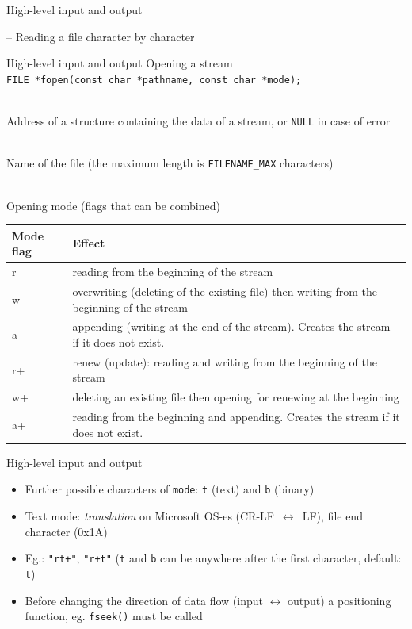 \documentclass[usenames,dvipsnames,aspectratio=169]{beamer}
\begin{document}
\begin{frame}{High-level input and output}
  \begin{exampleblock}{ -- Reading a file character by character}
    \scriptsize
    
  \end{exampleblock}
\end{frame}

\begin{frame}{High-level input and output}
  Opening a stream\\
  \footnotesize
  \texttt{FILE *fopen(const char *pathname, const char *mode);} \\
  \begin{description}[mm]
    \item[\texttt{FILE*}] \hfill \\
      Address of a structure containing the data of a stream, or \texttt{NULL} in case of error
    \item[\texttt{pathname}] \hfill \\
      Name of the file (the maximum length is \texttt{FILENAME\_MAX} characters)
    \item[\texttt{mode}] \hfill \\
      Opening mode (flags that can be combined)
  \end{description}
  \scriptsize
  \begin{tabular}{ll}
  Mode flag & Effect\\ \hline
  r & reading from the beginning of the stream\\
  w & overwriting (deleting of the existing file) then writing from the beginning of the stream\\
  a & appending (writing at the end of the stream). Creates the stream if it does not exist.\\
  r+ & renew (update): reading and writing from the beginning of the stream\\
  w+ & deleting an existing file then opening for renewing at the beginning\\
  a+ & reading from the beginning and appending. Creates the stream if it does not exist.\\
  \end{tabular}
\end{frame}

\begin{frame}{High-level input and output}
  \begin{itemize}
    \item Further possible characters of \texttt{mode}: \texttt{t} (text) and \texttt{b} (binary)
    \item Text mode: \emph{translation} on Microsoft OS-es (CR-LF~$\leftrightarrow$~LF), file end character (0x1A)
    \item Eg.: \texttt{"rt+"}, \texttt{"r+t"} (\texttt{t} and \texttt{b} can be anywhere after the first character, default: \texttt{t})
    \item Before changing the direction of data flow (input $\leftrightarrow$ output) a positioning function, eg. \texttt{fseek()} must be called
  \end{itemize}
\end{frame}
\end{document}
